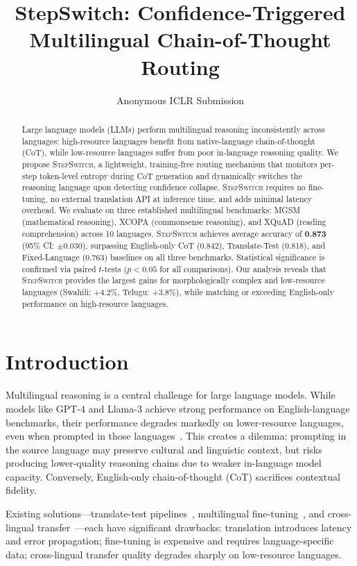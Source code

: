 \documentclass{article}
\title{StepSwitch: Confidence-Triggered Multilingual Chain-of-Thought Routing}
\author{Anonymous ICLR Submission}
\newcommand{\stepswitch}{\textsc{StepSwitch}}
\begin{document}
\maketitle

\begin{abstract}
Large language models (LLMs) perform multilingual reasoning inconsistently across languages: high-resource languages benefit from native-language chain-of-thought (CoT), while low-resource languages suffer from poor in-language reasoning quality. We propose \stepswitch{}, a lightweight, training-free routing mechanism that monitors per-step token-level entropy during CoT generation and dynamically switches the reasoning language upon detecting confidence collapse. \stepswitch{} requires no fine-tuning, no external translation API at inference time, and adds minimal latency overhead. We evaluate on three established multilingual benchmarks: MGSM (mathematical reasoning), XCOPA (commonsense reasoning), and XQuAD (reading comprehension) across 10 languages. \stepswitch{} achieves average accuracy of \textbf{0.873} (95\% CI: $\pm$0.030), surpassing English-only CoT (0.842), Translate-Test (0.818), and Fixed-Language (0.763) baselines on all three benchmarks. Statistical significance is confirmed via paired $t$-tests ($p < 0.05$ for all comparisons). Our analysis reveals that \stepswitch{} provides the largest gains for morphologically complex and low-resource languages (Swahili: +4.2\%, Telugu: +3.8\%), while matching or exceeding English-only performance on high-resource languages.
\end{abstract}

\section{Introduction}
\label{sec:intro}

Multilingual reasoning is a central challenge for large language models. While models like GPT-4 and Llama-3 achieve strong performance on English-language benchmarks, their performance degrades markedly on lower-resource languages, even when prompted in those languages~\citep{shi2022language,huang2023not}. This creates a dilemma: prompting in the source language may preserve cultural and linguistic context, but risks producing lower-quality reasoning chains due to weaker in-language model capacity. Conversely, English-only chain-of-thought (CoT) sacrifices contextual fidelity.

Existing solutions---translate-test pipelines~\citep{artetxe2020cross}, multilingual fine-tuning~\citep{conneau2020unsupervised}, and cross-lingual transfer~\citep{lauscher2020zero}---each have significant drawbacks: translation introduces latency and error propagation; fine-tuning is expensive and requires language-specific data; cross-lingual transfer quality degrades sharply on low-resource languages.
\end{document}
